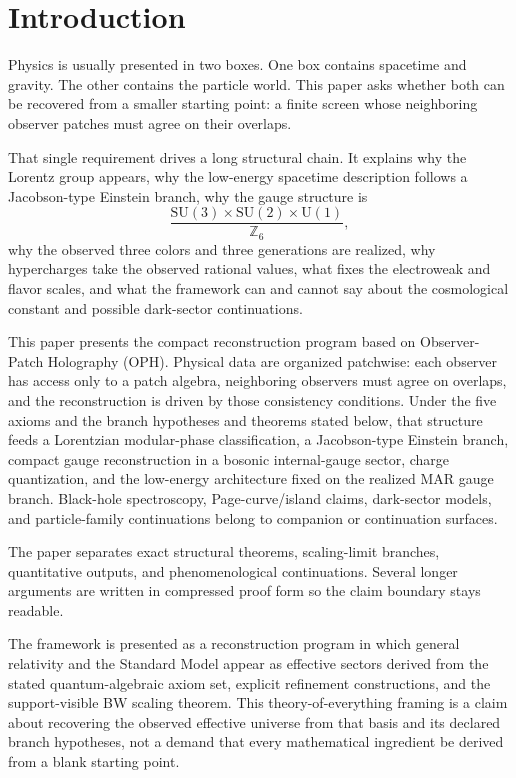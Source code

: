 \documentclass[11pt]{article}
\newcommand{\SU}{\mathrm{SU}}
\newcommand{\U}{\mathrm{U}}
\begin{document}
\section{Introduction}

Physics is usually presented in two boxes. One box contains spacetime and gravity. The other contains the particle world. This paper asks whether both can be recovered from a smaller starting point: a finite screen whose neighboring observer patches must agree on their overlaps.

That single requirement drives a long structural chain. It explains why the Lorentz group appears, why the low-energy spacetime description follows a Jacobson-type Einstein branch, why the gauge structure is
\[
\frac{\SU(3)\times\SU(2)\times\U(1)}{\mathbb Z_6},
\]
why the observed three colors and three generations are realized, why hypercharges take the observed rational values, what fixes the electroweak and flavor scales, and what the framework can and cannot say about the cosmological constant and possible dark-sector continuations.

This paper presents the compact reconstruction program based on Observer-Patch Holography (OPH).
Physical data are organized patchwise: each observer has access only to a patch algebra,
neighboring observers must agree on overlaps, and the reconstruction is driven by those
consistency conditions. Under the five axioms and the branch hypotheses and theorems stated below,
that structure feeds a Lorentzian modular-phase classification, a Jacobson-type Einstein branch,
compact gauge reconstruction in a bosonic internal-gauge sector, charge quantization, and the
low-energy architecture fixed on the realized MAR gauge branch.
Black-hole spectroscopy, Page-curve/island claims, dark-sector models, and particle-family
continuations belong to companion or continuation surfaces.

The paper separates exact structural theorems, scaling-limit branches, quantitative outputs, and phenomenological continuations. Several longer arguments are written in compressed proof form so the claim boundary stays readable.

The framework is presented as a reconstruction program in which general relativity and the Standard Model appear as effective sectors derived from the stated quantum-algebraic axiom set, explicit refinement constructions, and the support-visible BW scaling theorem. This theory-of-everything framing is a claim about recovering the observed effective universe from that basis and its declared branch hypotheses, not a demand that every mathematical ingredient be derived from a blank starting point.
\end{document}
